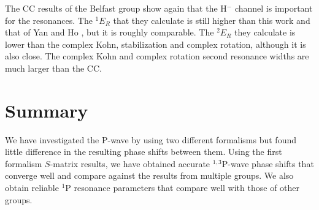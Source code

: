 \documentclass[Dissertation.tex]{subfiles}
\begin{document}
The CC results of the Belfast group \cite{Blackwood2002,Blackwood2002b,Walters2004}
show again that the H$^-$ channel is important for the resonances. 
The $^1E_R$ that they calculate is still higher 
than this work and that of Yan and Ho \cite{Yan1999,Yan2003}, but it is roughly comparable. 
The $^2E_R$ they calculate is lower than the complex 
Kohn, stabilization and complex rotation, although it is also close. The complex
Kohn and complex rotation second resonance widths are much larger than the CC.


\section{Summary}
\label{sec:SummaryP}

We have investigated the P-wave by using two different formalisms but found little 
difference in the resulting phase shifts between them. Using the first formalism
$S$-matrix results, we have obtained accurate $^{1,3}$P-wave phase shifts that
converge well and compare against the results from multiple groups. We also
obtain reliable $^1$P resonance parameters that compare well with those of other
groups.





\biblio
\end{document}
